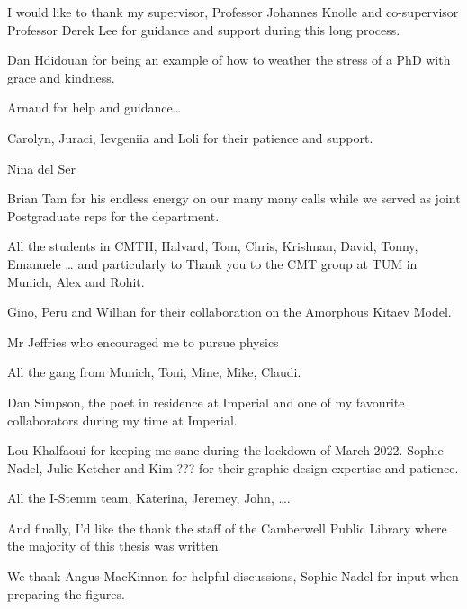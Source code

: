 I would like to thank my supervisor, Professor Johannes Knolle and co-supervisor Professor Derek Lee for guidance and support during this long process.

Dan Hdidouan for being an example of how to weather the stress of a PhD with grace and kindness.

Arnaud for help and guidance\ldots{}

Carolyn, Juraci, Ievgeniia and Loli for their patience and support.

Nina del Ser

Brian Tam for his endless energy on our many many calls while we served as joint Postgraduate reps for the department.

All the students in CMTH, Halvard, Tom, Chris, Krishnan, David, Tonny, Emanuele \ldots{} and particularly to Thank you to the CMT group at TUM in Munich, Alex and Rohit.

Gino, Peru and Willian for their collaboration on the Amorphous Kitaev Model.

Mr Jeffries who encouraged me to pursue physics

All the gang from Munich, Toni, Mine, Mike, Claudi.

Dan Simpson, the poet in residence at Imperial and one of my favourite collaborators during my time at Imperial.

Lou Khalfaoui for keeping me sane during the lockdown of March 2022. Sophie Nadel, Julie Ketcher and Kim ??? for their graphic design expertise and patience.

All the I-Stemm team, Katerina, Jeremey, John, \ldots.

And finally, I'd like the thank the staff of the Camberwell Public Library where the majority of this thesis was written.

We thank Angus MacKinnon for helpful discussions, Sophie Nadel for input when preparing the figures.
